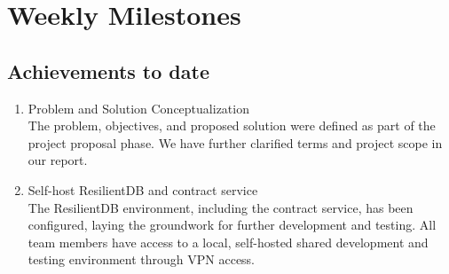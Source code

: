 \section{Weekly Milestones}

\subsection{Achievements to date}
\begin{enumerate}
    \item Problem and Solution Conceptualization \\
        The problem, objectives, and proposed solution were defined as part of the project proposal phase.
        We have further clarified terms and project scope in our report.
    \item Self-host ResilientDB and contract service \\
        The ResilientDB environment, including the contract service, has been configured, laying the groundwork for further development and testing. All team members have access to a local, self-hosted shared development and testing environment through VPN access.
\end{enumerate}



